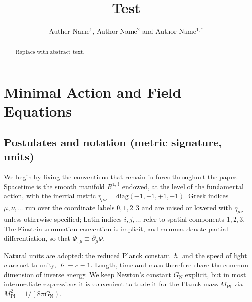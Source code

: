 \documentclass{iopjournal}
\begin{document}

\title{Test}

\author{Author Name$^1$, Author Name$^2$ and Author Name$^{1,*}$}






\begin{abstract}
Replace with abstract text. 
\end{abstract}


\setcounter{section}{1}
\section{Minimal Action and Field Equations}

\subsection{Postulates and notation (metric signature, units)}

We begin by fixing the conventions that remain in force throughout the paper. Spacetime is the smooth manifold $R^{\mathbb{1},\mathbb{3}}$ endowed, at the level of the fundamental action, with the inertial metric $\eta_{\mu \nu }=\mathrm{diag}\left(-1,+1,+1,+1\right)$. Greek indices $\mu ,\nu ,\mathrm{\dots }$ run over the coordinate labels $0,1,2,3$ and are raised or lowered with ${\eta }_{\mu \nu }$ unless otherwise specified; Latin indices $i,j,\mathrm{\dots }$ refer to spatial components $1,2,3$. The Einstein summation convention is implicit, and commas denote partial differentiation, so that ${\Phi}_{,\mu }\equiv {\partial }_{\mu }\Phi$.

Natural units are adopted: the reduced Planck constant $\hslash $ and the speed of light $c$ are set to unity, $\mathrm{\hslash }=c=1$. Length, time and mass therefore share the common dimension of inverse energy. We keep Newton's constant $G_{\mathrm{N}}$ explicit, but in most intermediate expressions it is convenient to trade it for the Planck mass $M_{\mathrm{Pl}}$ via $M^2_{\mathrm{Pl}}=1/\left(8\pi G_{\mathrm{N}}\right)$.
\end{document}
